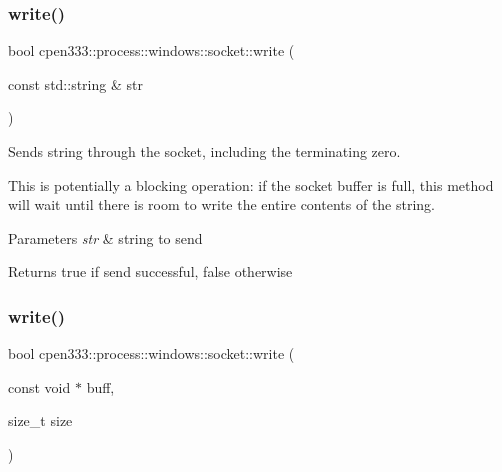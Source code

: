 \subsubsection{\texorpdfstring{write()}{write()}\hspace{0.1cm}{\footnotesize\ttfamily [1/2]}}
{\footnotesize\ttfamily bool cpen333\+::process\+::windows\+::socket\+::write (\begin{DoxyParamCaption}\item[{const std\+::string \&}]{str }\end{DoxyParamCaption})\hspace{0.3cm}{\ttfamily [inline]}}



Sends string through the socket, including the terminating zero. 

This is potentially a blocking operation\+: if the socket buffer is full, this method will wait until there is room to write the entire contents of the string.


\begin{DoxyParams}{Parameters}
{\em str} & string to send \\
\hline
\end{DoxyParams}
\begin{DoxyReturn}{Returns}
true if send successful, false otherwise 
\end{DoxyReturn}
\mbox{\label{classcpen333_1_1process_1_1windows_1_1socket_a62255247b7e8a9963e9ae5c24c6e5348}} 
\subsubsection{\texorpdfstring{write()}{write()}\hspace{0.1cm}{\footnotesize\ttfamily [2/2]}}
{\footnotesize\ttfamily bool cpen333\+::process\+::windows\+::socket\+::write (\begin{DoxyParamCaption}\item[{const void $\ast$}]{buff,  }\item[{size\+\_\+t}]{size }\end{DoxyParamCaption})\hspace{0.3cm}{\ttfamily [inline]}}



